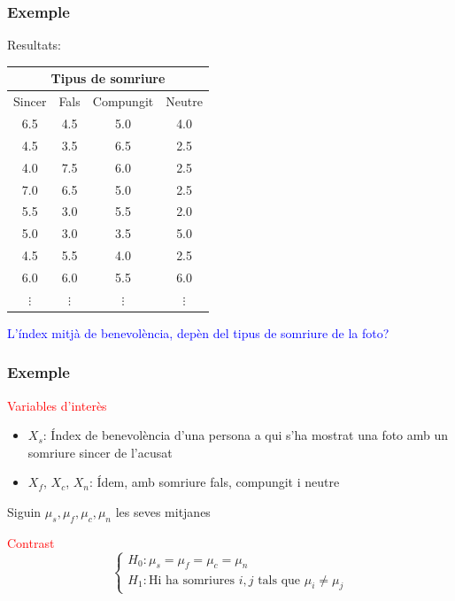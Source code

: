\documentclass[12pt,t]{beamer}
\newcommand{\red}[1]{\textcolor{red}{#1}}
\newcommand{\blue}[1]{\textcolor{blue}{#1}}
\theoremstyle{plain}
\theoremstyle{definition}
\begin{document}
\begin{frame}
\frametitle{Exemple}

Resultats: 
\begin{center}
\begin{tabular}{cccc}
\multicolumn{4}{c}{Tipus de somriure}\\\hline
Sincer & Fals & Compungit & Neutre\\\hline
6.5 &4.5 &  5.0  &  4.0 \\
4.5 &3.5 & 6.5  &  2.5  \\
4.0 &7.5 & 6.0  &  2.5  \\
7.0  &6.5 & 5.0  &  2.5  \\
5.5 & 3.0 & 5.5  & 2.0  \\
5.0  &3.0 & 3.5  &  5.0  \\
4.5  &5.5 & 4.0  & 2.5  \\
6.0 & 6.0 &5.5  &6.0    \\
$\vdots$ & $\vdots$ & $\vdots$ & $\vdots$ 
\end{tabular}
\end{center}\pause\medskip

\blue{L'índex mitjà de benevolència, depèn del tipus de somriure de la foto?}
\end{frame}


\begin{frame}
\frametitle{Exemple}

\red{Variables d'interès}\medskip
\begin{itemize}
\item $X_s$: Índex de benevolència d'una persona a qui s'ha mostrat una foto amb un somriure sincer de l'acusat\medskip

\item $X_f$, $X_c$, $X_n$: Ídem, amb somriure fals, compungit i neutre
\end{itemize}
\medskip

Siguin $\mu_s,\mu_f,\mu_c,\mu_n$ les seves mitjanes\medskip

\red{Contrast}
$$
\left\{
\begin{array}{l}
H_0 : \mu_s=\mu_{f}=\mu_{c}=\mu_{n} \\
H_1 : \mbox{Hi ha  somriures }i,j\mbox{ tals que }  \mu_i \not=\mu_j
\end{array}
\right.
$$

\end{frame}
\end{document}
